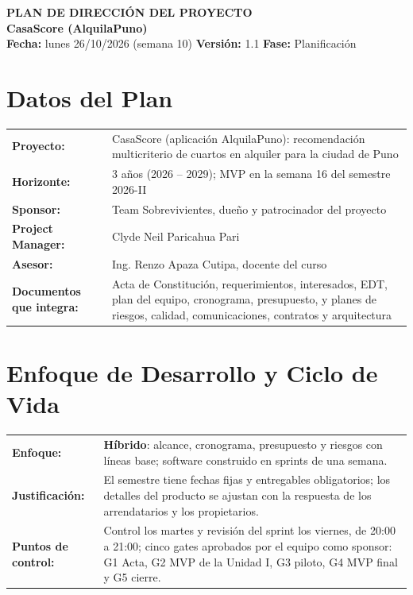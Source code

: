 \documentclass[11pt,a4paper]{article}
\begin{document}
\begin{center}
    {\Large \textbf{\textcolor{AzulUNA}{PLAN DE DIRECCIÓN DEL PROYECTO}}}\\[3pt]
    {\normalsize \textbf{CasaScore (AlquilaPuno)}}\\[4pt]
    \footnotesize \textbf{Fecha:} lunes 26/10/2026 (semana 10) \quad \textbar\quad \textbf{Versión:} 1.1 \quad \textbar\quad \textbf{Fase:} Planificación
\end{center}

\vspace{0.1cm}

\section{Datos del Plan}
\noindent\begin{tabularx}{\textwidth}{@{}P{4.6cm} L@{}}
\toprule
\textbf{Proyecto:} & CasaScore (aplicación AlquilaPuno): recomendación multicriterio de cuartos en alquiler para la ciudad de Puno \\
\textbf{Horizonte:} & 3 años (2026 -- 2029); MVP en la semana 16 del semestre 2026-II \\
\textbf{Sponsor:} & Team Sobrevivientes, dueño y patrocinador del proyecto \\
\textbf{Project Manager:} & Clyde Neil Paricahua Pari \\
\textbf{Asesor:} & Ing. Renzo Apaza Cutipa, docente del curso \\
\textbf{Documentos que integra:} & Acta de Constitución, requerimientos, interesados, EDT, plan del equipo, cronograma, presupuesto, y planes de riesgos, calidad, comunicaciones, contratos y arquitectura \\
\bottomrule
\end{tabularx}

\section{Enfoque de Desarrollo y Ciclo de Vida}
\noindent\begin{tabularx}{\textwidth}{@{}P{3.4cm} L@{}}
\toprule
\textbf{Enfoque:} & \textbf{Híbrido}: alcance, cronograma, presupuesto y riesgos con líneas base; software construido en sprints de una semana. \\
\textbf{Justificación:} & El semestre tiene fechas fijas y entregables obligatorios; los detalles del producto se ajustan con la respuesta de los arrendatarios y los propietarios. \\
\textbf{Puntos de control:} & Control los martes y revisión del sprint los viernes, de 20:00 a 21:00; cinco gates aprobados por el equipo como sponsor: G1 Acta, G2 MVP de la Unidad I, G3 piloto, G4 MVP final y G5 cierre. \\
\bottomrule
\end{tabularx}
\end{document}
